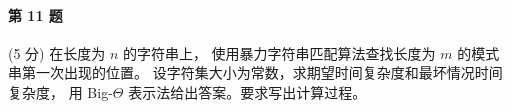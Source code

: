 \paragraph{第 11 题} (5 分) 在长度为 $n$ 的字符串上，
使用暴力字符串匹配算法查找长度为 $m$ 的模式串第一次出现的位置。
设字符集大小为常数，求期望时间复杂度和最坏情况时间复杂度，
用 Big-$\Theta$ 表示法给出答案。要求写出计算过程。
